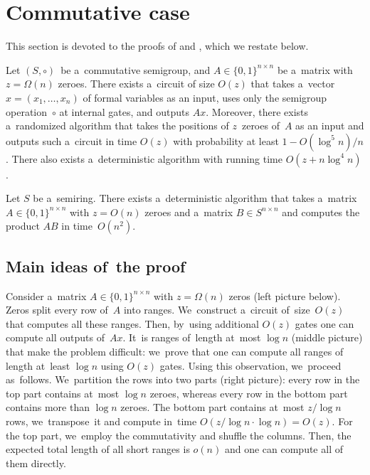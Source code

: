\documentclass{toc}
\begin{document}
\section{Commutative case}\label{sec-commutative}

This section is devoted to the proofs of  and
, which we %
restate  %
below.

%
\begin{theorem}
    \label{thm:upperbound}
	Let $(S, \circ)$~be a~commutative semigroup,
	and $A \in \{0,1\}^{n \times n}$ be a~matrix
	with~$z=\Omega(n)$ zeroes.
	There exists a~circuit of size $O(z)$ that takes
	a~vector $x = (x_1,\ldots, x_n)$ of formal variables as an input,
	uses only the semigroup operation~$\circ$ at internal gates,
	and outputs $Ax$. Moreover, there exists a~randomized
	algorithm that takes the positions of $z$~zeroes of~$A$
	as an input and outputs such a~circuit in time $O(z)$
	with probability at least $1-O(\log^5n)/n$. There also
	exists a~deterministic algorithm with running time $O(z+n\log^4n)$.
\end{theorem}

%
%
%
%
%
%
%
%
%
%
%
%
%

\begin{corollary}
    \label{cor:matrixmultiplication}
    Let $S$ be a~semiring. There exists a~deterministic algorithm that takes a~matrix
    ${A \in \{0,1\}^{n \times n}}$ with $z=O(n)$ zeroes and a~matrix
    $B \in S^{n \times n}$ and computes the product $AB$ in time~$O(n^2)$.
\end{corollary}

\subsection{Main ideas of~the proof}

Consider a~matrix $A \in \{0,1\}^{n \times n}$
with $z=\Omega(n)$ zeros (left picture below).
Zeros split every row of~$A$ into ranges.
We~construct a~circuit of~size~$O(z)$ that computes all these ranges. Then, by~using additional $O(z)$ gates one can
compute all outputs of~$Ax$. It~is ranges of~length at~most $\log n$ (middle picture) that make the problem difficult:
we~prove that one can compute
all ranges of length at~least $\log n$ using $O(z)$ gates.
Using this observation, we~proceed as~follows.
We~partition the rows into two parts (right picture): every row in the top part contains at~most $\log n$ zeroes, whereas every row in the bottom part contains more than $\log n$ zeroes. The bottom part contains at~most $z/\log n$
%
rows,
we~transpose~it and compute in~time $O(z/\log n \cdot \log n)=O(z)$. For the top part, we~employ the commutativity and shuffle the columns. Then, the expected total length of all short ranges is $o(n)$ and one can
compute all of them directly.
\end{document}
